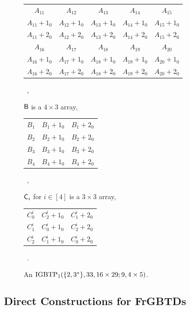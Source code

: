 \documentclass[draft, 11pt]{article}
\begin{document}
\begin{figure}
{\begin{tabular}{|ccccc|}
$A_{11}$ & $A_{12}$ & $A_{13}$ & $A_{14}$ & $A_{15}$ \\
$A_{11}+1_0$ & $A_{12}+1_0$ & $A_{13}+1_0$ & $A_{14}+1_0$ & $A_{15}+1_0$ \\
$A_{11}+2_0$ & $A_{12}+2_0$ & $A_{13}+2_0$ & $A_{14}+2_0$ & $A_{15}+2_0$ \\

$A_{16}$ & $A_{17}$ & $A_{18}$ & $A_{19}$ & $A_{20}$ \\
$A_{16}+1_0$ & $A_{17}+1_0$ & $A_{18}+1_0$ & $A_{19}+1_0$ & $A_{20}+1_0$ \\
$A_{16}+2_0$ & $A_{17}+2_0$ & $A_{18}+2_0$ & $A_{19}+2_0$ & $A_{20}+2_0$ \\
\hline
\end{tabular}\ ,}

\vskip 5pt
\flushleft \normalsize ${\sf B}$ is a $4\times 3$ array,
\vskip 5pt
\renewcommand{\arraystretch}{1.2}
\setlength{\tabcolsep}{1pt} 
\centering 
\begin{tabular}{|ccc|}
\hline
$B_1$ & $B_1+1_0$ & $B_1+2_0$ \\ 
$B_2$ & $B_2+1_0$ & $B_2+2_0$ \\ 
$B_3$ & $B_3+1_0$ & $B_3+2_0$ \\
$B_4$ & $B_4+1_0$ & $B_4+2_0$ \\  

\hline
\end{tabular}\ , 


\vskip 5pt
\flushleft ${\sf C}_i$ for $i\in[4]$ is a $3\times 3$ array,
\vskip 5pt
\renewcommand{\arraystretch}{1.2}
\setlength{\tabcolsep}{1pt} 
\centering 

\begin{tabular}{|ccc|}
\hline
$C^i_0$ 	& $C^i_{2}+1_0$ & $C^i_1+2_0$ \\ 
$C^i_1$ 	& $C^i_0+1_0$ 	 & $C^i_2+2_0$ \\ 
$C^i_2$ 	& $C^i_{1}+1_0$ & $C^i_{0}+2_0$ \\
\hline
\end{tabular}\ .


 \caption{An ${\rm IGBTP}_1(\{2,3^*\},33,16\times29;9,4\times 5)$.}
 \label{fig:IGBTP-24-9}

\end{figure}

 \subsection{Direct Constructions for FrGBTDs}
\end{document}
